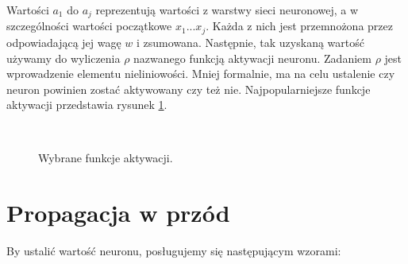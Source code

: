 Wartości \(a_1\) do \(a_j\) reprezentują wartości z warstwy sieci neuronowej, a w szczególności wartości początkowe \(x_1 ... x_j\). Każda z nich jest przemnożona przez odpowiadającą jej wagę \(w\) i zsumowana. Następnie, tak uzyskaną wartość używamy do wyliczenia \(\rho\) nazwanego funkcją aktywacji neuronu. Zadaniem \(\rho\) jest wprowadzenie elementu nieliniowości. Mniej formalnie, ma na celu ustalenie czy neuron powinien zostać aktywowany czy też nie.
Najpopularniejsze funkcje aktywacji przedstawia rysunek \ref{fig:activations}.

\begin{figure}
~
~
\caption{Wybrane funkcje aktywacji.}
\label{fig:activations}
\end{figure}

\section{Propagacja w przód}

By ustalić wartość neuronu, posługujemy się następującym wzorami:

